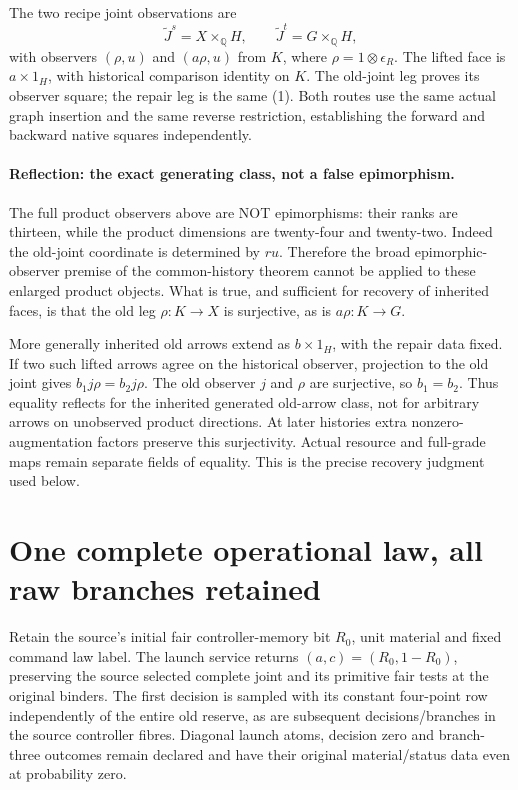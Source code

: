 \documentclass{article}
\begin{document}
The two recipe joint observations are
\[
 \widetilde J^s=X\times_{\mathbb Q}H,\qquad
 \widetilde J^t=G\times_{\mathbb Q}H,
\]
with observers $(\rho,u)$ and $(a\rho,u)$ from $K$, where $\rho=1\otimes\epsilon_R$. The lifted face is $a\times1_H$, with historical comparison identity on $K$. The old-joint leg proves its observer square; the repair leg is the same (1). Both routes use the same actual graph insertion and the same reverse restriction, establishing the forward and backward native squares independently.

\paragraph{Reflection: the exact generating class, not a false epimorphism.}
The full product observers above are NOT epimorphisms: their ranks are thirteen, while the product dimensions are twenty-four and twenty-two. Indeed the old-joint coordinate is determined by $r u$. Therefore the broad epimorphic-observer premise of the common-history theorem cannot be applied to these enlarged product objects. What is true, and sufficient for recovery of inherited faces, is that the old leg $\rho:K\to X$ is surjective, as is $a\rho:K\to G$.

More generally inherited old arrows extend as $b\times1_H$, with the repair data fixed. If two such lifted arrows agree on the historical observer, projection to the old joint gives $b_1j\rho=b_2j\rho$. The old observer $j$ and $\rho$ are surjective, so $b_1=b_2$. Thus equality reflects for the inherited generated old-arrow class, not for arbitrary arrows on unobserved product directions. At later histories extra nonzero-augmentation factors preserve this surjectivity. Actual resource and full-grade maps remain separate fields of equality. This is the precise recovery judgment used below.

\section{One complete operational law, all raw branches retained}
Retain the source's initial fair controller-memory bit $R_0$, unit material and fixed command law label. The launch service returns $(a,c)=(R_0,1-R_0)$, preserving the source selected complete joint and its primitive fair tests at the original binders. The first decision is sampled with its constant four-point row independently of the entire old reserve, as are subsequent decisions/branches in the source controller fibres. Diagonal launch atoms, decision zero and branch-three outcomes remain declared and have their original material/status data even at probability zero.
\end{document}
